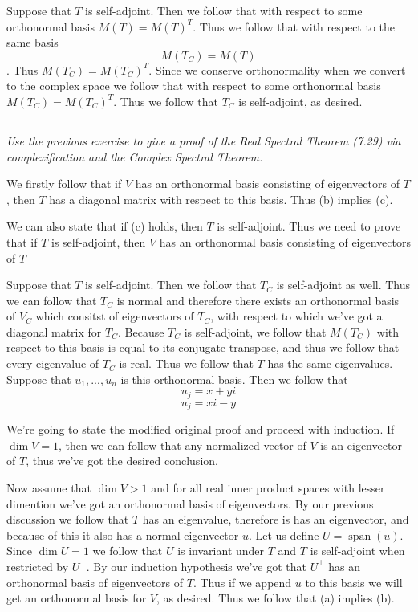\documentclass[11pt,oneside,titlepage]{book}
\DeclareMathOperator \Span {span}
\begin{document}
Suppose that $T$ is self-adjoint. Then we follow that with respect to
some orthonormal basis $M(T) = M(T)^T$. Thus we follow that with respect to the same basis
$$M(T_C) = M(T)$$. Thus $M(T_C) = M(T_C)^T$.
Since we conserve orthonormality when we convert to the complex space we follow that
with respect to some orthonormal basis $M(T_C) = M(T_C)^T$. Thus we follow that
$T_C$ is self-adjoint, as desired.

\subsection{}

\textit{Use the previous exercise to give a proof of the Real Spectral Theorem (7.29) via
  complexification and the Complex Spectral Theorem.}

We firstly follow that if $V$ has an orthonormal basis consisting of
eigenvectors of $T$, then $T$ has a diagonal matrix with respect to this basis. Thus
(b) implies (c).

We can also state that if (c) holds, then $T$ is self-adjoint. Thus we need
to prove that if $T$ is self-adjoint, then $V$ has an orthonormal basis consisting of
eigenvectors of $T$

Suppose that $T$ is self-adjoint. Then we follow that $T_C$ is self-adjoint as well.
Thus we can follow that $T_C$ is normal and therefore there exists an orthonormal
basis of $V_C$ which consitst of  eigenvectors of $T_C$, with respect to which
we've got a diagonal matrix for $T_C$. Because $T_C$ is self-adjoint, we follow that
$M(T_C)$ with respect to this basis is equal to its conjugate transpose, and thus
we follow that every eigenvalue of $T_C$ is real. Thus we follow that $T$ has the
same eigenvalues. Suppose that $u_1, ..., u_n$ is this orthonormal basis.
Then we follow that 
$$u_j = x + yi$$
$$u_j = xi - y$$

We're going to state the modified original proof and proceed with induction.
If $\dim V = 1$, then we can follow that any normalized vector of $V$ is an
eigenvector of $T$, thus we've got the desired conclusion.

Now assume that $\dim V > 1$ and for all real inner product spaces  with lesser dimention
we've got an orthonormal basis of eigenvectors. By our previous discussion we follow that
$T$ has an eigenvalue, therefore is has an eigenvector, and because of this it also has
a normal eigenvector $u$. Let us define $U = \Span(u)$. Since $\dim U = 1$ we follow that
$U$ is invariant under $T$ and $T$ is self-adjoint when restricted by $U^{\perp}$.
By our induction hypothesis we've got that $U^{\perp}$ has an orthonormal basis
of eigenvectors of $T$. Thus if we append $u$ to this basis we will get an orthonormal basis
for $V$, as desired. Thus we follow that (a) implies (b).
\end{document}
